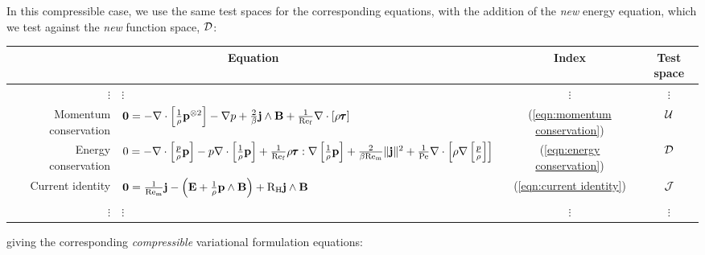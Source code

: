     In this compressible case, we use the same test spaces for the corresponding equations, with the addition of the \emph{new} energy equation, which we test against the \emph{new} function space, $\mathcal{D}$: 
    \begin{center}\begin{tabular}{ r l c | c }
        \multicolumn{2}{c}{Equation}  &  Index  &  Test space  \\
        \hline\hline
        $\vdots$  &  $\vdots$  &  $\vdots$  &  $\vdots$  \\
        Momentum conservation  &  $\mathbf{0} 
         =  - \nabla\cdot\left[\frac{1}{\rho}\mathbf{p}^{\otimes 2}\right] - \nabla p + \frac{2}{\beta}\mathbf{j}\wedge\mathbf{B} + \frac{1}{\mathrm{Re}_{\mathrm{f}}}\nabla\cdot[\rho\pmb{\mathsf{\tau}}]$  &  (\ref{eqn:momentum conservation})  &  $\mathcal{U}$  \\
        Energy conservation  &  $0  =  - \nabla\cdot\left[\frac{p}{\rho}\mathbf{p}\right] - p\nabla\cdot\left[\frac{1}{\rho}\mathbf{p}\right] + \frac{1}{\mathrm{Re}_{\mathrm{f}}}\rho\pmb{\mathsf{\tau}}:\nabla\left[\frac{1}{\rho}\mathbf{p}\right] + \frac{2}{\beta\mathrm{Re}_{\mathrm{m}}}\|\mathbf{j}\|^{2} + \frac{1}{\mathrm{Pe}}\nabla\cdot\left[\rho\nabla\left[\frac{p}{\rho}\right]\right]$  &  (\ref{eqn:energy conservation})  &  $\mathcal{D}$  \\
        \hline
        Current identity  &  $\mathbf{0}  =  \frac{1}{\mathrm{Re}_{\mathrm{m}}}\mathbf{j} - \left(\mathbf{E} + \frac{1}{\rho}\mathbf{p}\wedge\mathbf{B}\right) + \mathrm{R}_{\mathrm{H}}\mathbf{j}\wedge\mathbf{B}$  &  (\ref{eqn:current identity})  &  $\mathcal{J}$  \\
        \hline
        $\vdots$  &  $\vdots$  &  $\vdots$  &  $\vdots$  \\
    \end{tabular}\end{center}
    giving the corresponding \emph{compressible} variational formulation equations:
